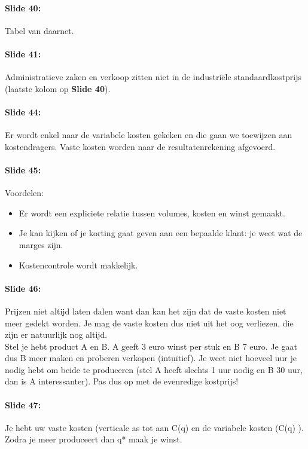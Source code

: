 \documentclass[10pt,a4paper]{report}
\begin{document}
\paragraph{Slide 40:} Tabel van daarnet.

\paragraph{Slide 41:} Administratieve zaken en verkoop zitten niet in de industri\"ele standaardkostprijs (laatste kolom op \textbf{Slide 40}).

\paragraph{Slide 44:} Er wordt enkel naar de variabele kosten gekeken en die gaan we toewijzen aan kostendragers. Vaste kosten worden naar de resultatenrekening afgevoerd.

\paragraph{Slide 45:} Voordelen:
\begin{itemize}
\item Er wordt een expliciete relatie tussen volumes, kosten en winst gemaakt.
\item Je kan kijken of je korting gaat geven aan een bepaalde klant: je weet wat de marges zijn.
\item Kostencontrole wordt makkelijk.
\end{itemize}

\paragraph{Slide 46:} Prijzen niet altijd laten dalen want dan kan het zijn dat de vaste kosten niet meer gedekt worden. Je mag de vaste kosten dus niet uit het oog verliezen, die zijn er natuurlijk nog altijd.\\
Stel je hebt product A en B. A geeft 3 euro winst per stuk en B 7 euro. Je gaat dus B meer maken en proberen verkopen (intu\"itief). Je weet niet hoeveel uur je nodig hebt om beide te produceren (stel A heeft slechts 1 uur nodig en B 30 uur, dan is A interessanter). Pas dus op met de evenredige kostprijs!

\paragraph{Slide 47:} Je hebt uw vaste kosten (verticale as tot aan C(q) en de variabele kosten (C(q) ). Zodra je meer produceert dan q* maak je winst. 
\end{document}
